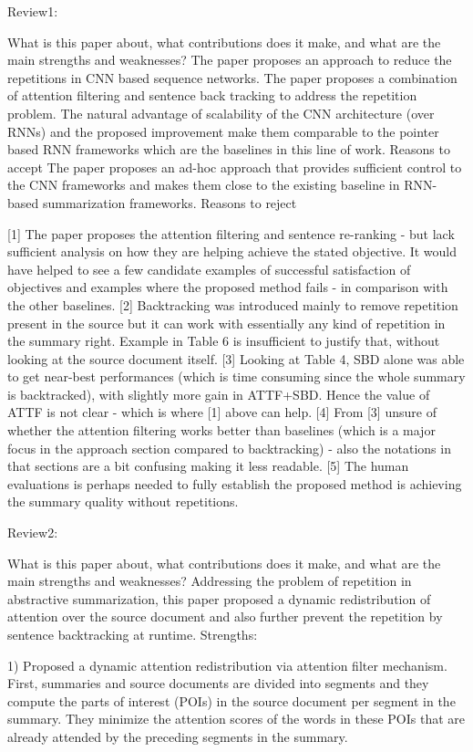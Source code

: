 Review1:

What is this paper about, what contributions does it make, and what are the main strengths and weaknesses?
The paper proposes an approach to reduce the repetitions in CNN based sequence networks. The paper proposes a combination of attention filtering and sentence back tracking to address the repetition problem. The natural advantage of scalability of the CNN architecture (over RNNs) and the proposed improvement make them comparable to the pointer based RNN frameworks which are the baselines in this line of work.
Reasons to accept
The paper proposes an ad-hoc approach that provides sufficient control to the CNN frameworks and makes them close to the existing baseline in RNN-based summarization frameworks.
Reasons to reject

[1] The paper proposes the attention filtering and sentence re-ranking - but lack sufficient analysis on how they are helping achieve the stated objective. It would have helped to see a few candidate examples of successful satisfaction of objectives and examples where the proposed method fails - in comparison with the other baselines. 
[2] Backtracking was introduced mainly to remove repetition present in the source but it can work with essentially any kind of repetition in the summary right. Example in Table 6 is insufficient to justify that, without looking at the source document itself. 
[3] Looking at Table 4, SBD alone was able to get near-best performances (which is time consuming since the whole summary is backtracked), with slightly more gain in ATTF+SBD. Hence the value of ATTF is not clear - which is where [1] above can help. 
[4] From [3] unsure of whether the attention filtering works better than baselines (which is a major focus in the approach section compared to backtracking) - also the notations in that sections are a bit confusing making it less readable. 
[5] The human evaluations is perhaps needed to fully establish the proposed method is achieving the summary quality without repetitions.

Review2:

What is this paper about, what contributions does it make, and what are the main strengths and weaknesses?
Addressing the problem of repetition in abstractive summarization, this paper proposed a dynamic redistribution of attention over the source document and also further prevent the repetition by sentence backtracking at runtime.
Strengths:

1) Proposed a dynamic attention redistribution via attention filter mechanism. First, summaries and source documents are divided into segments and they compute the parts of interest (POIs) in the source document per segment in the summary. They minimize the attention scores of the words in these POIs that are already attended by the preceding segments in the summary.

